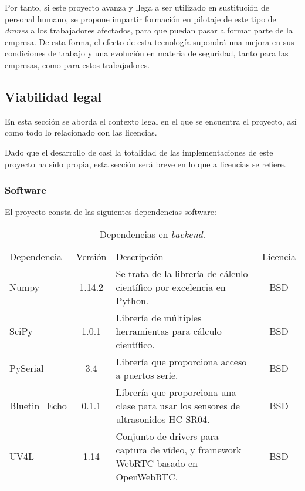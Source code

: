 Por tanto, si este proyecto avanza y llega a ser utilizado en sustitución de personal humano, se propone impartir formación en pilotaje de este tipo de \emph{drones} a los trabajadores afectados, para que puedan pasar a formar parte de la empresa. De esta forma, el efecto de esta tecnología supondrá una mejora en sus condiciones de trabajo y una evolución en materia de seguridad, tanto para las empresas, como para estos trabajadores.


\subsection{Viabilidad legal}

En esta sección se aborda el contexto legal en el que se encuentra el proyecto, así como todo lo relacionado con las licencias. 

Dado que el desarrollo de casi la totalidad de las implementaciones de este proyecto ha sido propia, esta sección será breve en lo que a licencias se refiere. 

\subsubsection{Software}
El proyecto consta de las siguientes dependencias software:

\begin{table}
\begin{center}
		\begin{tabular}{l  c  m{6cm}  c}\hline
			\toprule
			Dependencia & Versión & Descripción & Licencia\\
			\otoprule
			Numpy & 1.14.2 & Se trata de la librería de cálculo científico por excelencia en Python.  & BSD  \\
			SciPy & 1.0.1 & Librería de múltiples herramientas para cálculo científico.  & BSD\\
			PySerial & 3.4 & Librería que proporciona acceso a puertos serie. & BSD\\
			Bluetin\_Echo & 0.1.1 & Librería que proporciona una clase para usar los sensores de ultrasonidos HC-SR04. & BSD\\
			UV4L & 1.14 & Conjunto de drivers para captura de vídeo, y framework WebRTC basado en OpenWebRTC. & BSD\\
			
			\bottomrule
		\end{tabular}
		\caption{Dependencias en \emph{backend}.}
		\label{tb:licensebackend}
		\end{center}
\end{table}

